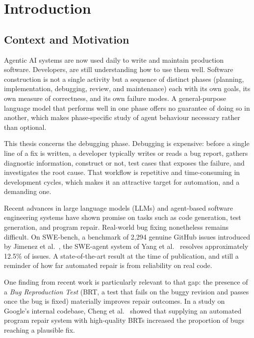 \chapter{Introduction}
\label{ch:introduction}

\section{Context and Motivation}
\label{sec:intro-context}
Agentic AI systems are now used daily to write and maintain production software.
Developers, are still understanding how to use them well. 
Software construction is not a single activity but a sequence of distinct phases
(planning, implementation, debugging, review, and maintenance) each with
its own goals, its own measure of correctness, and its own failure modes. A
general-purpose language model that performs well in one phase offers no
guarantee of doing so in another, which makes phase-specific study of agent
behaviour necessary rather than optional.

This thesis concerns the debugging phase. Debugging is expensive: before a single
line of a fix is written, a developer typically writes or reads a bug report,
gathers diagnostic information, construct or not, test cases that exposes the failure,
and investigates the root cause. That workflow is repetitive and time-consuming in development cycles, which makes it an
attractive target for automation, and a demanding one.

Recent advances in large language models (LLMs) and agent-based software
engineering systems have shown promise on tasks such as code generation, test
generation, and program repair. Real-world bug fixing nonetheless remains
difficult. On SWE-bench, a benchmark of 2,294 genuine GitHub issues introduced by
Jimenez et al.~\cite{Jimenez2023SWEbench}, the SWE-agent system of Yang et
al.~\cite{Yang2024SWEagent} resolves approximately 12.5\% of issues. A
state-of-the-art result at the time of publication, and still a reminder of how
far automated repair is from reliability on real code.

One finding from recent work is particularly relevant to that gap: the presence
of a \emph{Bug Reproduction Test} (BRT, a test that fails on the buggy
revision and passes once the bug is fixed) materially improves repair
outcomes. In a study on Google's internal codebase, Cheng et
al.~\cite{Cheng2025Agentic} showed that supplying an automated program repair
system with high-quality BRTs increased the proportion of bugs reaching a
plausible fix.

